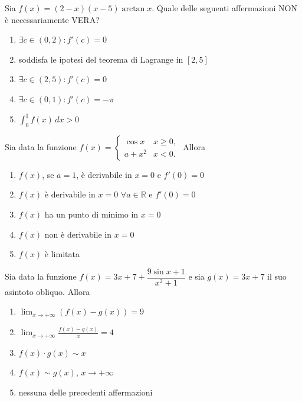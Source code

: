 \begin{quiz}
Sia $f(x)=(2-x)(x-5)\arctan x$. Quale delle seguenti affermazioni NON \`e necessariamente VERA?
\begin{enumerate}
\item $\exists c\in(0,2):f\prime(c)=0$
\item soddisfa le ipotesi del teorema di Lagrange in $[2,5]$
\item $\exists c\in(2,5):f\prime(c)=0$
\item $\exists c\in(0,1):f\prime(c)=-\pi$
\item $\displaystyle\int_0^1 f(x)\,dx>0$
\end{enumerate}
\end{quiz}

\begin{quiz}
Sia data la funzione $\displaystyle f(x)=\begin{cases}\cos x&x\ge0,\\a+x^2&x<0.\end{cases}$ Allora
\begin{enumerate}
\item $f(x)$, se $a=1$, \`e derivabile in $x=0$ e $f\prime(0)=0$
\item $f(x)$ \`e derivabile in $x=0$ $\forall a\in\mathbb R$ e $f\prime(0)=0$
\item $f(x)$ ha un punto di minimo in $x=0$
\item $f(x)$ non \`e derivabile in $x=0$
\item $f(x)$ \`e limitata
\end{enumerate}
\end{quiz}

\begin{quiz}
Sia data la funzione $f(x)=3x+7+\dfrac{9\sin x+1}{x^2+1}$ e sia $g(x)=3x+7$ il suo asintoto obliquo. Allora
\begin{enumerate}
\item $\displaystyle\lim_{x\to+\infty}(f(x)-g(x))=9$
\item $\displaystyle\lim_{x\to+\infty}\frac{f(x)-g(x)}x=4$
\item $f(x)\cdot g(x)\sim x$
\item $f(x)\sim g(x)$, $x\to+\infty$
\item nessuna delle precedenti affermazioni
\end{enumerate}
\end{quiz}

